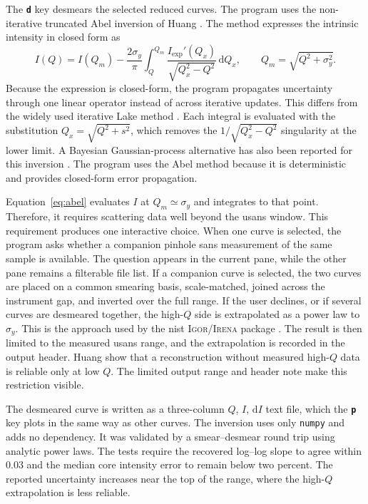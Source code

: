 \documentclass[tm]{ornltm}
\newcommand{\key}[1]{\textbf{\texttt{#1}}}
\begin{document}
The \key{d} key desmears the selected reduced curves. The program uses the
non-iterative truncated Abel inversion of Huang \autocite{huang2026abel}. The
method expresses the intrinsic intensity in closed form as
%
\begin{equation}
  I(Q) = I(Q_m) - \frac{2\sigma_y}{\pi}
    \int_Q^{Q_m}\frac{I_\text{exp}'(Q_x)}{\sqrt{Q_x^2 - Q^2}}\,\mathrm{d}Q_x,
  \qquad Q_m = \sqrt{Q^2 + \sigma_y^2}.
  \label{eq:abel}
\end{equation}
%
Because the expression is closed-form, the program propagates uncertainty
through one linear operator instead of across iterative updates. This differs
from the widely used iterative Lake method \autocite{lake1967}. Each integral is
evaluated with the substitution $Q_x = \sqrt{Q^2 + s^2}$, which removes the
$1/\sqrt{Q_x^2 - Q^2}$ singularity at the lower limit. A Bayesian
Gaussian-process alternative has also been reported for this inversion
\autocite{tung2026gpr}.
The program uses the Abel method because it is deterministic and provides
closed-form error propagation.

Equation~\eqref{eq:abel} evaluates $I$ at $Q_m \simeq \sigma_y$ and integrates
to that point. Therefore, it requires scattering data well beyond the
\ac{usans} window. This requirement produces one interactive choice. When one
curve is selected, the program asks whether a companion pinhole \ac{sans}
measurement of the same sample is available. The question appears in the current
pane, while the other pane remains a filterable file list. If a companion curve
is selected, the two curves are placed on a common smearing basis, scale-matched,
joined across the instrument gap, and inverted over the full range. If the user
declines, or if several curves are desmeared together, the high-$Q$ side is
extrapolated as a power law to $\sigma_y$. This is the approach used by the
\ac{nist} \textsc{Igor}/\textsc{Irena} package \autocite{kline2006}. The result
is then limited to the measured \ac{usans} range, and the extrapolation is
recorded in the output header. Huang \autocite{huang2026abel} show that a
reconstruction without measured high-$Q$ data is reliable only at low $Q$. The
limited output range and header note make this restriction visible.

The desmeared curve is written as a three-column $Q$, $I$, $\mathrm{d}I$ text
file, which the \key{p} key plots in the same way as other curves. The inversion
uses only \texttt{numpy} and adds no dependency. It was validated by a
smear--desmear round trip using analytic power laws. The tests require the
recovered log--log slope to agree within 0.03 and the median core intensity error
to remain below two percent. The reported uncertainty increases near the top of
the range, where the high-$Q$ extrapolation is less reliable.
\end{document}
